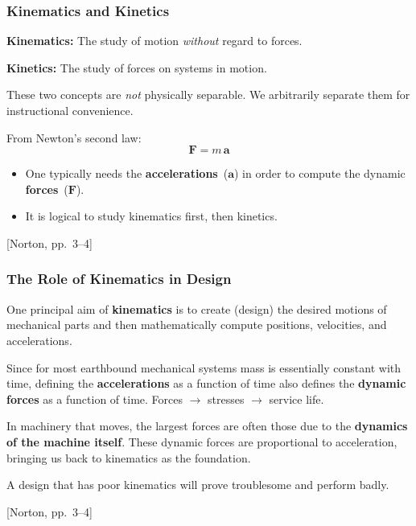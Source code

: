 \documentclass[10pt,aspectratio=43]{beamer}
\newcommand{\pref}[1]{\vfill\hfill{\scriptsize\color{gray}[Norton, pp.~#1]}}
\begin{document}

\begin{frame}
\frametitle{Kinematics and Kinetics}

\begin{yellowbox}
\textbf{Kinematics:} The study of motion \emph{without} regard to forces.

\textbf{Kinetics:} The study of forces on systems in motion.
\end{yellowbox}

\vspace{6pt}
These two concepts are \emph{not} physically separable. We arbitrarily separate them for instructional convenience.

\vspace{6pt}
From Newton's second law:
\[
  \mathbf{F} = m\,\mathbf{a}
\]
\begin{itemize}
  \item One typically needs the \textbf{accelerations}~($\mathbf{a}$) in order to compute the dynamic \textbf{forces}~($\mathbf{F}$).
  \item It is logical to study kinematics first, then kinetics.
\end{itemize}
\pref{3--4}
\end{frame}

\begin{frame}
\frametitle{The Role of Kinematics in Design}

One principal aim of \textbf{kinematics} is to create (design) the desired motions of mechanical parts and then mathematically compute positions, velocities, and accelerations.

\vspace{6pt}
\begin{redbox}
Since for most earthbound mechanical systems mass is essentially constant with time, defining the \textbf{accelerations} as a function of time also defines the \textbf{dynamic forces} as a function of time. Forces $\to$ stresses $\to$ service life.
\end{redbox}

\vspace{6pt}
In machinery that moves, the largest forces are often those due to the \textbf{dynamics of the machine itself}. These dynamic forces are proportional to acceleration, bringing us back to kinematics as the foundation.

\vspace{6pt}
\begin{yellowbox}
A design that has poor kinematics will prove troublesome and perform badly.
\end{yellowbox}
\pref{3--4}
\end{frame}
\end{document}
